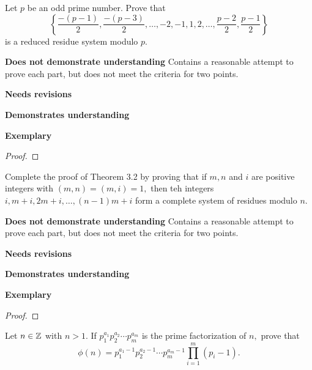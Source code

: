 \documentclass[letterpaper, 11pt]{../ximera}
\begin{document}
\begin{ex}[Exercise 74]\label{ch2-ex74}
	Let $p$ be an odd prime number. Prove that
	\[\left\{\frac{-(p-1)}{2}, \frac{-(p-3)}{2},\dots, -2,-1,1,2,\dots,\frac{p-2}{2},\frac{p-1}{2}\right\}\]
	is a reduced residue system modulo $p$.
\end{ex}

\begin{writeRubric}
    \item \textbf{Does not demonstrate understanding}
     Contains a reasonable attempt to prove each part, but does not meet the criteria for two points.
    \item \textbf{Needs revisions}
     
    \item \textbf{Demonstrates understanding}
    
    \item \textbf{Exemplary}
        
\end{writeRubric}
                                       \begin{proof}
 
\end{proof}


\begin{ex}
 	Complete the proof of Theorem 3.2 by proving that if $m,n$ and $i$ are positive integers with $(m,n)=(m,i)=1,$ then teh integers $i,m+i,2m+i,\dots,(n-1)m+i$ form a complete system of residues modulo $n$.
\end{ex}

\begin{writeRubric}
    \item \textbf{Does not demonstrate understanding}
     Contains a reasonable attempt to prove each part, but does not meet the criteria for two points.
    \item \textbf{Needs revisions}
     
    \item \textbf{Demonstrates understanding}
    
    \item \textbf{Exemplary}
        
\end{writeRubric}
                                       \begin{proof}
 
\end{proof}

\begin{ex}
 	Let $n\in\mathbb Z$ with $n>1.$ If $p_1^{a_1}p_2^{a_2}\cdots p_m^{a_m}$ is the prime factorization of $n,$ prove that 
	\[\phi(n)=p_1^{a_1-1}p_2^{a_2-1}\cdots p_m^{a_m-1}\prod_{i=1}^m(p_i-1).\]
\end{ex}
\end{document}
